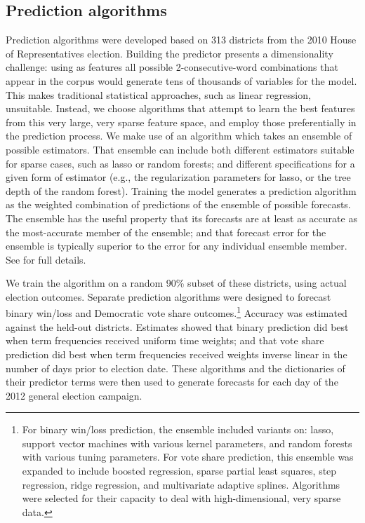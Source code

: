 \documentclass{article}
\begin{document}
\subsection{Prediction algorithms}
\label{sec:pred-algor}

Prediction algorithms were developed based on 313 districts from the
2010 House of Representatives election. Building the predictor
presents a dimensionality challenge: using as features all possible
2-consecutive-word combinations that appear in the corpus would generate tens of
thousands of variables for the model. This makes traditional
statistical approaches, such as linear regression,
unsuitable. Instead, we choose algorithms that attempt to learn the
best features from this very large, very sparse feature space, and
employ those preferentially in the prediction process. We make use of
an algorithm which takes an ensemble of possible
estimators. That ensemble can include both different estimators
suitable for sparse cases, such as lasso or random forests; and
different specifications for a given form of estimator (e.g., the
regularization parameters for lasso, or the tree depth of the random forest). Training the model generates a
prediction algorithm as the weighted combination of predictions of the
ensemble of possible forecasts. The ensemble has the useful property
that its forecasts are at least as accurate as the most-accurate
member of the ensemble; and that forecast error for the ensemble is
typically superior to the error for any individual ensemble
member. See \citep{van2007super} for full details.

We train the algorithm on a random 90\% subset of
these districts, using actual election outcomes. Separate prediction
algorithms were designed to forecast binary win/loss and Democratic
vote share outcomes.\footnote{For binary win/loss
  prediction, the ensemble
included variants on: lasso, support vector machines with various
kernel parameters, and random forests with various tuning
parameters. For vote share prediction, this ensemble was expanded to
include boosted regression, sparse partial least squares, step
regression, ridge regression, and multivariate adaptive splines. Algorithms were selected for their capacity to deal with
high-dimensional, very sparse data.} Accuracy was
estimated against the held-out districts. Estimates showed that binary
prediction did best when term frequencies received uniform time
weights; and that vote share prediction did best when term frequencies
received weights inverse linear in the number of days prior to
election date. These algorithms and the dictionaries of their
predictor terms were then used to generate forecasts for each day of
the 2012 general election campaign.
\end{document}
